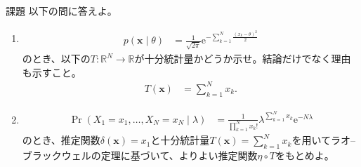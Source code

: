 \documentclass[lualatex,handout]{beamer}
\theoremstyle{definition}
\begin{document}
\begin{frame}{課題}
\small
以下の問に答えよ。
\begin{enumerate}
\setlength{\itemsep}{1em}
\item 
\begin{align*}
p(\symbf{x}\mid\theta)&= \frac1{\sqrt{2\pi}}\mathrm{e}^{-\sum_{k=1}^N\frac{(x_k-\theta)^2}2}
\end{align*}
のとき、以下の$T\colon\mathbb{R}^N\to\mathbb{R}$が十分統計量かどうか示せ。結論だけでなく理由も示すこと。
\begin{align*}
T(\symbf{x})&= \sum_{k=1}^N x_k.
\end{align*}
\item
\begin{align*}
\Pr(X_1=x_1,\dotsc,X_N=x_N\mid\lambda)&= \frac1{\prod_{k=1}^N x_k!}\lambda^{\sum_{k=1}^N x_k} \mathrm{e}^{-N\lambda}
\end{align*}
のとき、推定関数$\delta(\symbf{x})=x_1$と十分統計量$T(\symbf{x})=\sum_{k=1}^Nx_k$を用いてラオ--ブラックウェルの定理に基づいて、よりよい推定関数$\eta\circ T$をもとめよ。
\end{enumerate}
\end{frame}
\end{document}
